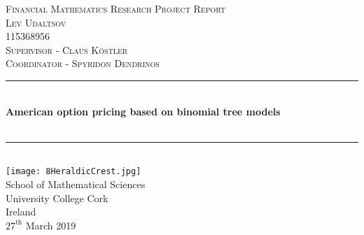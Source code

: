 \documentclass[letterpaper,12pt]{article}
\theoremstyle{plain}
\numberwithin{equation}{section}
\begin{document}
\begin{titlepage}
\newcommand{\HRule}{\rule{\linewidth}{0.5mm}} %

  \center %



  \textsc{\Large Financial Mathematics Research Project Report}\\[0.5cm] %
  \textsc{\large Lev Udaltsov}\\[0.5cm] %
  \textsc{\large 115368956}\\[0.5cm] %
  \textsc{\large Supervisor - Claus Köstler}\\[0.5cm] %
  \textsc{\large Coordinator - Spyridon Dendrinos}\\[0.5cm] %


  \vspace{1. cm}
  \HRule \\[0.4cm]
  { \huge \bfseries \textbf{American option pricing based on binomial tree models\\}}\\[0.4cm] %
  \HRule \\[1.5cm]
 
\texttt{[image: 8HeraldicCrest.jpg]}\\[.5cm]



  \vspace{1. cm}
  {\large School of Mathematical Sciences\\
  University College Cork\\
  Ireland\\
  $\text{27}^{\text{th}}$ March 2019}\\[3cm] %
   


\vfill %

\end{titlepage}

\end{document}
